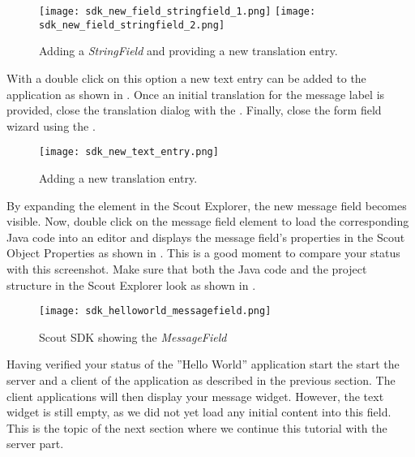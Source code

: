 \begin{figure}
\texttt{[image: sdk\_new\_field\_stringfield\_1.png]} \hspace{8mm}
\texttt{[image: sdk\_new\_field\_stringfield\_2.png]}
\caption{Adding a \textit{StringField} and providing a new translation entry.}
\end{figure}

With a double click on this option a new text entry can be added to the application as shown in .
Once an initial translation for the message label is provided, close the translation dialog with the .
Finally, close the form field wizard using the .

\begin{figure}
\texttt{[image: sdk\_new\_text\_entry.png]}
\caption{Adding a new translation entry.}
\end{figure}

By expanding the  element in the Scout Explorer, the new message field becomes visible. 
Now, double click on the message field element to load the corresponding Java code into an editor and displays the message field's properties in the Scout Object Properties as shown in .
This is a good moment to compare your status with this screenshot.
Make sure that both the Java code and the project structure in the Scout Explorer look as shown in . 

\begin{figure}
\texttt{[image: sdk\_helloworld\_messagefield.png]}
\caption{Scout SDK showing the \it{MessageField}}
\end{figure}

Having verified your status of the ''Hello World'' application start the start the server and a client of the application as described in the previous section.
The client applications will then display your message widget.
However, the text widget is still empty, as we did not yet load any initial content into this field.
This is the topic of the next section where we continue this tutorial with the server part.

